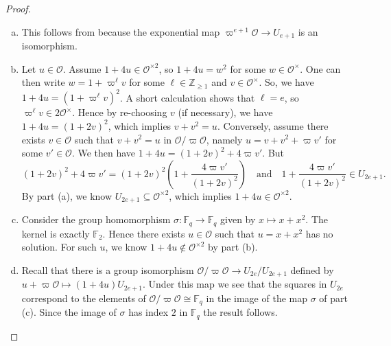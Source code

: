 \documentclass[10pt, letterpaper]{amsart}
\theoremstyle{plain}
\theoremstyle{definition}
\numberwithin{equation}{section}
\newcommand{\F}{\mathbb{F}}
\newcommand{\Z}{\mathbb{Z}}
\newcommand{\Ocal}{\mathcal{O}}
\newcommand{\qand}{{\quad\text{and}\quad}}
\begin{document}
\begin{proof}
\quad
\begin{enumerate}[(a)]
\item This follows from \cite[(5.5) Proposition, page 137]{Neukirch} because the exponential map $\varpi^{e+1}\Ocal\to U_{e+1}$ is an isomorphism.

\item Let $u\in\Ocal$. Assume $1+4u\in\Ocal^{\times 2}$, so $1+4u=w^2$ for some $w\in\Ocal^\times$. One can then write $w=1+\varpi^{\ell}v$ for some $\ell\in\Z_{\geq 1}$ and $v\in \Ocal^\times$. So, we have $1+4u=(1+\varpi^{\ell} v)^2$. A short calculation shows that $\ell=e$, so $\varpi^{\ell}v\in 2\Ocal^\times$. Hence by re-choosing $v$ (if necessary), we have $1+4u=(1+2v)^2$, which implies $v+v^2=u$. Conversely, assume there exists $v\in \Ocal$ such that $v+v^2=u$ in $\Ocal\slash\varpi\Ocal$, namely $u=v+v^2+\varpi v'$ for some $v'\in\Ocal$. We then have $1+4u=(1+2v)^2+4\varpi v'$. But
\[
(1+2v)^2+4\varpi v'=(1+2v)^2(1+\frac{4\varpi v'}{(1+2v)^2})\qand 1+\frac{4\varpi v'}{(1+2v)^2}\in U_{2e+1}.
\]
By part (a), we know $U_{2e+1}\subseteq \Ocal^{\times 2}$, which implies $1+4u\in\Ocal^{\times 2}$.

\item Consider the group homomorphism $\sigma:\F_{q}\to\F_{q}$ given by $x\mapsto x+x^2$. The kernel is exactly $\mathbb{F}_{2}$. Hence there exists $u\in\Ocal$ such that $u=x+x^2$ has no solution. For such $u$, we know $1+4u\notin\Ocal^{\times 2}$ by part (b).

\item Recall that there is a group isomorphism $\Ocal/\varpi\Ocal \rightarrow U_{2e}/U_{2e+1}$ defined by $u+\varpi\Ocal \mapsto (1+4u)U_{2e+1}$. Under this map we see that the squares in $U_{2e}$ correspond to the elements of $\Ocal/\varpi\Ocal\cong \mathbb{F}_{q}$ in the image of the map $\sigma$ of part (c). Since the image of $\sigma$ has index $2$ in $\mathbb{F}_{q}$ the result follows.
\end{enumerate}
\end{proof}
\end{document}
